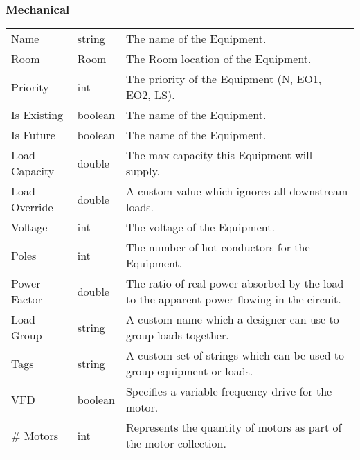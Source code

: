 \documentclass[letterpaper,10pt,english]{sphinxmanual}
\begin{document}
\subsubsection{Mechanical}
\label{\detokenize{docs/definitions/index-definitions:mechanical-definition}}\label{\detokenize{docs/definitions/index-definitions:id7}}

\begin{savenotes}\sphinxattablestart
\centering
\begin{tabulary}{\linewidth}[t]{|T|T|T|}
\hline
\sphinxstyletheadfamily 
{}
&\sphinxstyletheadfamily 
{}
&\sphinxstyletheadfamily 
{}
\\
\hline
Name
&
string
&
The name of the Equipment.
\\
\hline
Room
&
Room
&
The Room location of the Equipment.
\\
\hline
Priority
&
int
&
The priority of the Equipment (N, EO1, EO2, LS).
\\
\hline
Is Existing
&
boolean
&
The name of the Equipment.
\\
\hline
Is Future
&
boolean
&
The name of the Equipment.
\\
\hline
Load Capacity
&
double
&
The max capacity this Equipment will supply.
\\
\hline
Load Override
&
double
&
A custom value which ignores all downstream loads.
\\
\hline
Voltage
&
int
&
The voltage of the Equipment.
\\
\hline
Poles
&
int
&
The number of hot conductors for the Equipment.
\\
\hline
Power Factor
&
double
&
The ratio of real power absorbed by the load to the apparent power flowing in the circuit.
\\
\hline
Load Group
&
string
&
A custom name which a designer can use to group loads together.
\\
\hline
Tags
&
string
&
A custom set of strings which can be used to group equipment or loads.
\\
\hline
VFD
&
boolean
&
Specifies a variable frequency drive for the motor.
\\
\hline
\# Motors
&
int
&
Represents the quantity of motors as part of the motor collection.
\\
\hline
\end{tabulary}
\par
\sphinxattableend\end{savenotes}
\end{document}
